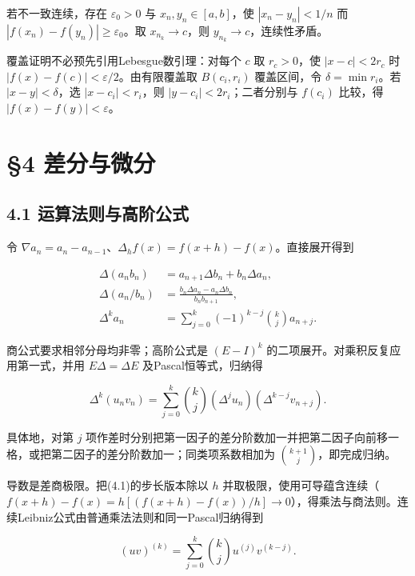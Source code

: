 \documentclass[11pt,a4paper]{article}
\begin{document}
若不一致连续，存在 \(\varepsilon_0>0\) 与 \(x_n,y_n\in[a,b]\)，使
\(|x_n-y_n|<1/n\) 而 \(|f(x_n)-f(y_n)|\ge\varepsilon_0\)。取
\(x_{n_k}\to c\)，则 \(y_{n_k}\to c\)，连续性矛盾。

覆盖证明不必预先引用Lebesgue数引理：对每个 \(c\) 取 \(r_c>0\)，使
\(|x-c|<2r_c\) 时 \(|f(x)-f(c)|<\varepsilon/2\)。由有限覆盖取
\(B(c_i,r_i)\) 覆盖区间，令 \(\delta=\min r_i\)。若 \(|x-y|<\delta\)，选
\(|x-c_i|<r_i\)，则 \(|y-c_i|<2r_i\)；二者分别与 \(f(c_i)\) 比较，得
\(|f(x)-f(y)|<\varepsilon\)。

\clearpage

\section{\S{}4 差分与微分}\label{ux5deeux5206ux4e0eux5faeux5206}

\subsection{4.1
运算法则与高阶公式}\label{ux8fd0ux7b97ux6cd5ux5219ux4e0eux9ad8ux9636ux516cux5f0f}

令
\(\nabla a_n=a_n-a_{n-1}\)、\(\Delta_hf(x)=f(x+h)-f(x)\)。直接展开得到

\[
\begin{aligned}
\Delta(a_nb_n)&=a_{n+1}\Delta b_n+b_n\Delta a_n,\\
\Delta(a_n/b_n)&=\frac{b_n\Delta a_n-a_n\Delta b_n}{b_nb_{n+1}},\\
\Delta^ka_n&=\sum_{j=0}^k(-1)^{k-j}\binom{k}{j}a_{n+j}.
\end{aligned}\tag{4.1}
\]

商公式要求相邻分母均非零；高阶公式是 \((E-I)^k\)
的二项展开。对乘积反复应用第一式，并用 \(E\Delta=\Delta E\)
及Pascal恒等式，归纳得

\[
\Delta^k(u_nv_n)=\sum_{j=0}^k\binom{k}{j}(\Delta^ju_n)(\Delta^{k-j}v_{n+j}).\tag{4.2}
\]

具体地，对第 \(j\)
项作差时分别把第一因子的差分阶数加一并把第二因子向前移一格，或把第二因子的差分阶数加一；同类项系数相加为
\(\binom{k+1}{j}\)，即完成归纳。

导数是差商极限。把(4.1)的步长版本除以 \(h\)
并取极限，使用可导蕴含连续（\(f(x+h)-f(x)=h[(f(x+h)-f(x))/h]\to0\)），得乘法与商法则。连续Leibniz公式由普通乘法法则和同一Pascal归纳得到

\[
(uv)^{(k)}=\sum_{j=0}^k\binom{k}{j}u^{(j)}v^{(k-j)}.
\]

\end{document}
